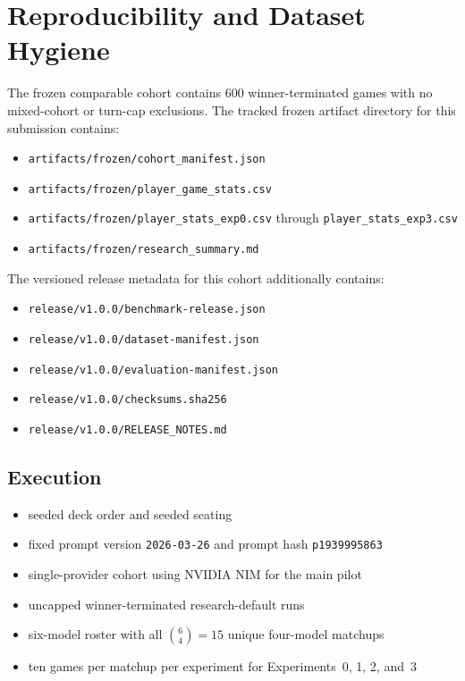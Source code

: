 \section{Reproducibility and Dataset Hygiene}

The frozen comparable cohort contains 600 winner-terminated games with no mixed-cohort or turn-cap exclusions. The tracked frozen artifact directory for this submission contains:
\begin{itemize}[leftmargin=1.25em]
  \item \texttt{artifacts/frozen/cohort\_manifest.json}
  \item \texttt{artifacts/frozen/player\_game\_stats.csv}
  \item \texttt{artifacts/frozen/player\_stats\_exp0.csv} through \texttt{player\_stats\_exp3.csv}
  \item \texttt{artifacts/frozen/research\_summary.md}
\end{itemize}

The versioned release metadata for this cohort additionally contains:
\begin{itemize}[leftmargin=1.25em]
  \item \texttt{release/v1.0.0/benchmark-release.json}
  \item \texttt{release/v1.0.0/dataset-manifest.json}
  \item \texttt{release/v1.0.0/evaluation-manifest.json}
  \item \texttt{release/v1.0.0/checksums.sha256}
  \item \texttt{release/v1.0.0/RELEASE\_NOTES.md}
\end{itemize}

\subsection{Execution}

\begin{itemize}[leftmargin=1.25em]
  \item seeded deck order and seeded seating
  \item fixed prompt version \texttt{2026-03-26} and prompt hash \texttt{p1939995863}
  \item single-provider cohort using NVIDIA NIM for the main pilot
  \item uncapped winner-terminated research-default runs
  \item six-model roster with all $\binom{6}{4}=15$ unique four-model matchups
  \item ten games per matchup per experiment for Experiments~0, 1, 2, and~3
\end{itemize}

